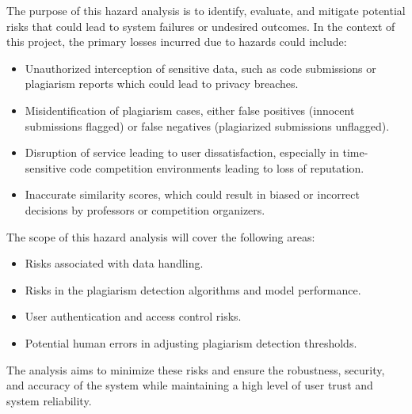 \documentclass{article}
\begin{document}
The purpose of this hazard analysis is to identify, evaluate, and mitigate potential risks that could lead to system failures or undesired outcomes. In the context of this project, the primary losses incurred due to hazards could include:

\begin{itemize}
    \item Unauthorized interception of sensitive data, such as code submissions or plagiarism reports which could lead to privacy breaches.
    \item Misidentification of plagiarism cases, either false positives (innocent submissions flagged) or false negatives (plagiarized submissions unflagged).
    \item Disruption of service leading to user dissatisfaction, especially in time-sensitive code competition environments leading to loss of reputation.
    \item Inaccurate similarity scores, which could result in biased or incorrect decisions by professors or competition organizers.
\end{itemize}

The scope of this hazard analysis will cover the following areas:
\begin{itemize}
    \item Risks associated with data handling.
    \item Risks in the plagiarism detection algorithms and model performance.
    \item User authentication and access control risks.
    \item Potential human errors in adjusting plagiarism detection thresholds.
\end{itemize}

The analysis aims to minimize these risks and ensure the robustness, security, and accuracy of the system while maintaining a high level of user trust and system reliability.
\end{document}

